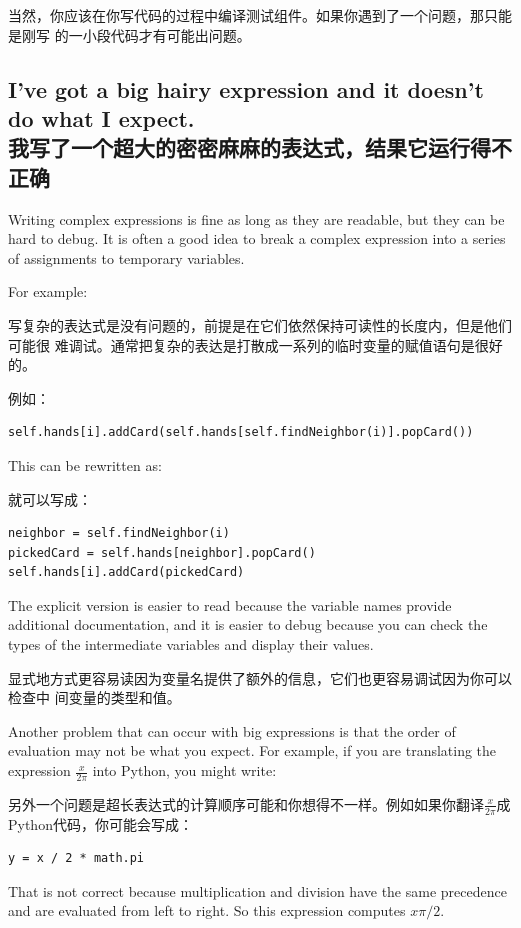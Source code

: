 \documentclass[10pt]{book}
\begin{document}
\begin{CJK}{UTF8}{gbsn}
当然，你应该在你写代码的过程中编译测试组件。如果你遇到了一个问题，那只能是刚写
的一小段代码才有可能出问题。

\subsection{I've got a big hairy expression and it doesn't
do what I expect.
\\我写了一个超大的密密麻麻的表达式，结果它运行得不正确}

Writing complex expressions is fine as long as they are readable,
but they can be hard to debug.  It is often a good idea to
break a complex expression into a series of assignments to
temporary variables.

For example:

写复杂的表达式是没有问题的，前提是在它们依然保持可读性的长度内，但是他们可能很
难调试。通常把复杂的表达是打散成一系列的临时变量的赋值语句是很好的。

例如：

\begin{verbatim}
self.hands[i].addCard(self.hands[self.findNeighbor(i)].popCard())
\end{verbatim}
%
This can be rewritten as:

就可以写成：

\begin{verbatim}
neighbor = self.findNeighbor(i)
pickedCard = self.hands[neighbor].popCard()
self.hands[i].addCard(pickedCard)
\end{verbatim}
%
The explicit version is easier to read because the variable
names provide additional documentation, and it is easier to debug
because you can check the types of the intermediate variables
and display their values.

显式地方式更容易读因为变量名提供了额外的信息，它们也更容易调试因为你可以检查中
间变量的类型和值。

Another problem that can occur with big expressions is
that the order of evaluation may not be what you expect.
For example, if you are translating the expression
$\frac{x}{2 \pi}$ into Python, you might write:

另外一个问题是超长表达式的计算顺序可能和你想得不一样。例如如果你翻译$\frac{x}{2
\pi}$成Python代码，你可能会写成：

\begin{verbatim}
y = x / 2 * math.pi
\end{verbatim}
%
That is not correct because multiplication and division have
the same precedence and are evaluated from left to right.
So this expression computes $x \pi / 2$.


\end{CJK}
\end{document}
